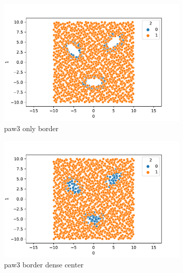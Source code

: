 \begin{figure}{}
\begin{subfigure}[b]{0.24\textwidth}
        \includegraphics[width=\textwidth]{plots/synthetic_dataset_visualizations/paw3-2d-only-border.csv.pdf}
        \caption[]%
        {{\small paw3 only border}}    
        \label{fig:paw3ob}
    \end{subfigure}
    \begin{subfigure}[b]{0.24\textwidth}   
        \centering 
        \includegraphics[width=\textwidth]{plots/synthetic_dataset_visualizations/paw3-2d-border-dense-center.csv.pdf}
        \caption[]%
        {{\small paw3 border dense center}}    
        \label{fig:paw3bdc}
    \end{subfigure}
    \begin{subfigure}[b]{0.24\textwidth}
        \centering

\end{subfigure}
\end{figure}
